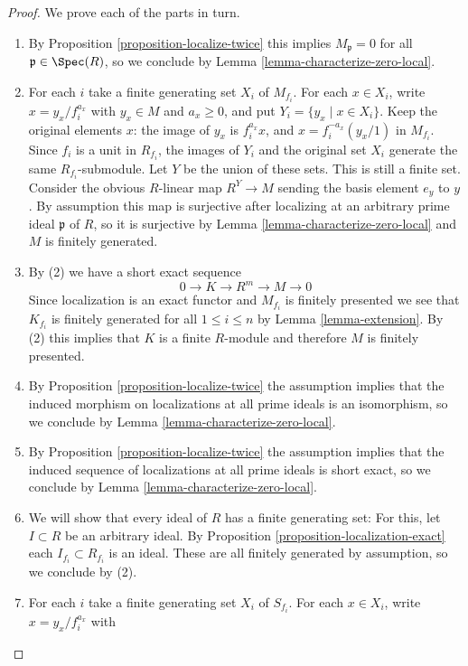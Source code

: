 \begin{proof}
We prove each of the parts in turn.
\begin{enumerate}
\item By Proposition \ref{proposition-localize-twice}
this implies $M_\mathfrak p = 0$ for all $\mathfrak p \in \Spec(R)$,
so we conclude by Lemma \ref{lemma-characterize-zero-local}.
\item For each $i$ take a finite generating set $X_i$ of $M_{f_i}$.
For each $x\in X_i$, write $x=y_x/f_i^{a_x}$ with
$y_x\in M$ and $a_x\geq0$, and put $Y_i=\{y_x\mid x\in X_i\}$.
Keep the original elements $x$: the image of $y_x$ is $f_i^{a_x}x$,
and $x=f_i^{-a_x}(y_x/1)$ in $M_{f_i}$.
Since $f_i$ is a unit in $R_{f_i}$, the images of $Y_i$ and the
original set $X_i$ generate the same $R_{f_i}$-submodule. Let $Y$
be the union of these sets. This is still a finite set.
Consider the obvious $R$-linear map $R^Y \rightarrow M$ sending the basis
element $e_y$ to $y$. By assumption this map is surjective after localizing
at an arbitrary prime ideal $\mathfrak p$ of $R$, so it is surjective by
Lemma \ref{lemma-characterize-zero-local}
and $M$ is finitely generated.
\item By (2) we have a short exact sequence
$$
0 \rightarrow K \rightarrow R^m \rightarrow M \rightarrow 0
$$
Since localization is an exact functor and $M_{f_i}$ is finitely
presented we see that $K_{f_i}$ is finitely generated for all
$1 \leq i \leq n$ by Lemma \ref{lemma-extension}.
By (2) this implies that $K$ is a finite $R$-module and therefore
$M$ is finitely presented.
\item By Proposition \ref{proposition-localize-twice}
the assumption implies that the induced morphism
on localizations at all prime ideals is an isomorphism, so we conclude
by Lemma \ref{lemma-characterize-zero-local}.
\item By Proposition \ref{proposition-localize-twice} the assumption
implies that the induced
sequence of localizations at all prime ideals is short exact, so we
conclude by Lemma \ref{lemma-characterize-zero-local}.
\item We will show that every ideal of $R$ has a finite generating set:
For this, let $I \subset R$ be an arbitrary ideal. By
Proposition \ref{proposition-localization-exact}
each $I_{f_i} \subset R_{f_i}$ is an ideal. These are all
finitely generated by assumption, so we conclude by (2).
\item For each $i$ take a finite generating set $X_i$ of $S_{f_i}$.
For each $x\in X_i$, write $x=y_x/f_i^{a_x}$ with

\end{enumerate}
\end{proof}
